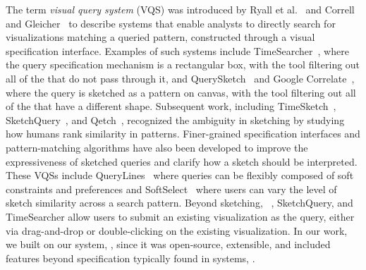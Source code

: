   \npar The term \emph{visual query system} (VQS) was introduced by Ryall et al.~\cite{ryall2005querylines} and Correll and Gleicher~\cite{correll2016semantics} to describe systems that enable analysts to directly search for  visualizations matching a queried pattern, constructed through a visual specification interface. Examples of such systems include TimeSearcher~\cite{Hochheiser2001,Hochheiser2004}, where the query specification mechanism is a rectangular box, with the tool filtering out all of the  that do not pass through it, and QuerySketch~\cite{wattenberg2001sketching} and Google Correlate~\cite{mohebbi2011google}, where the query is sketched as a pattern on canvas, with the tool filtering out all of the  that have a different shape. Subsequent work, including TimeSketch~\cite{Eichmann2015}, SketchQuery~\cite{correll2016semantics}, and Qetch~\cite{Mannino2018}, recognized the ambiguity in sketching by studying how humans rank similarity in patterns. Finer-grained specification interfaces and pattern-matching algorithms have also been developed to improve the expressiveness of sketched queries and clarify how a sketch should be interpreted. These VQSs include QueryLines~\cite{ryall2005querylines} where queries can be flexibly composed of soft constraints and preferences and SoftSelect~\cite{Holz2009} where users can vary the level of sketch similarity across a search pattern. Beyond sketching, \zv~\cite{Siddiqui2017,Siddiqui2017VLDB}, SketchQuery, and TimeSearcher allow users to submit an existing visualization as the query, either via drag-and-drop or double-clicking on the existing visualization. In our work, we built on our system, \zv, since it was open-source, extensible, and included features beyond  specification typically found in  systems, . %
